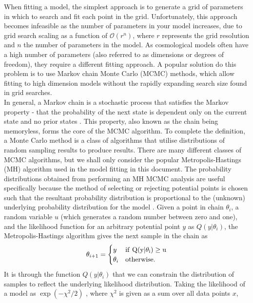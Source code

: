 \documentclass[titlesmallcaps, examinerscopy, copyrightpage]{uqthesis}
\begin{document}
When fitting a model, the simplest approach is to generate a grid of parameters in which to search and fit each point in the grid. Unfortunately, this approach becomes infeasible as the number of parameters in your model increases, due to grid search scaling as a function of $\mathcal{O}(r^n)$, where $r$ represents the grid resolution and $n$ the number of parameters in the model.  As cosmological models often have a high number of parameters (also referred to as dimensions or degrees of freedom), they require a different fitting approach. A popular solution do this problem is to use Markov chain Monte Carlo (MCMC) methods, which allow fitting to high dimension models without the rapidly expanding search size found in grid searches.\\

In general, a Markov chain is a stochastic process that satisfies the Markov property - that the probability  of the next state is dependent only on the current state and no prior states \citep{Markov1988theory}. This property, also known as the chain being memoryless, forms the core of the MCMC algorithm. To complete the definition, a Monte Carlo method is a class of algorithms that utilise distributions of random sampling results to produce results. There are many different classes of MCMC algorithms, but we shall only consider the popular Metropolis-Hastings (MH) algorithm used in the model fitting in this document. The probability distributions obtained from performing an MH MCMC analysis are useful specifically because the method of selecting or rejecting potential points is chosen such that the resultant probability distribution is proportional to the (unknown) underlying probability distribution for the model \citep{Hobson2010bayesian, Ivezic2013}. Given a point in chain $\theta_i$, a random variable $u$ (which generates a random number between zero and one), and the likelihood function for an arbitrary potential point $y$ as $Q(y|\theta_i)$, the Metropolis-Hastings algorithm gives the next sample in the chain as 
\begin{align}
\theta_{i+1} = \begin{cases}
y & \rm{if } \ Q(y|\theta_i) \geq u \\
\theta_i & \rm{otherwise.}
\end{cases}
\end{align}
It is through the function $Q(y|\theta_i)$ that we can constrain the distribution of samples to reflect the underlying likelihood distribution. Taking the likelihood of a model as $\exp(-\chi^2 / 2)$ \citep{Press1992}, where $\chi^2$ is given as a sum over all data points $x$,
\end{document}
